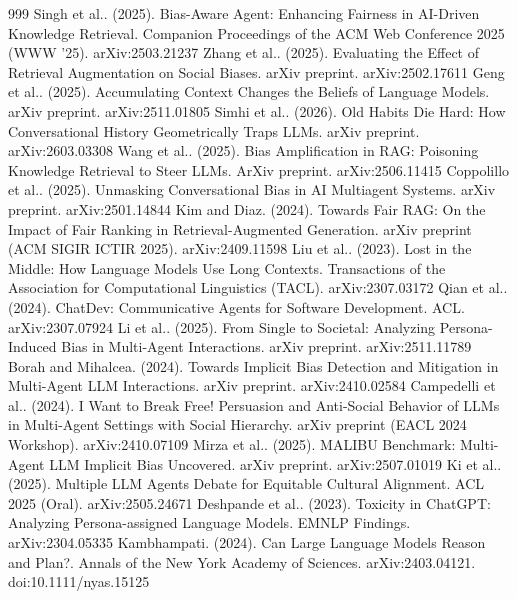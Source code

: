 \documentclass[10pt]{article}
\begin{document}
\begin{thebibliography}{999}
 Singh et al.. (2025). Bias-Aware Agent: Enhancing Fairness in AI-Driven Knowledge Retrieval. Companion Proceedings of the ACM Web Conference 2025 (WWW '25). arXiv:2503.21237
 Zhang et al.. (2025). Evaluating the Effect of Retrieval Augmentation on Social Biases. arXiv preprint. arXiv:2502.17611
 Geng et al.. (2025). Accumulating Context Changes the Beliefs of Language Models. arXiv preprint. arXiv:2511.01805
 Simhi et al.. (2026). Old Habits Die Hard: How Conversational History Geometrically Traps LLMs. arXiv preprint. arXiv:2603.03308
 Wang et al.. (2025). Bias Amplification in RAG: Poisoning Knowledge Retrieval to Steer LLMs. ArXiv preprint. arXiv:2506.11415
 Coppolillo et al.. (2025). Unmasking Conversational Bias in AI Multiagent Systems. arXiv preprint. arXiv:2501.14844
 Kim and Diaz. (2024). Towards Fair RAG: On the Impact of Fair Ranking in Retrieval-Augmented Generation. arXiv preprint (ACM SIGIR ICTIR 2025). arXiv:2409.11598
 Liu et al.. (2023). Lost in the Middle: How Language Models Use Long Contexts. Transactions of the Association for Computational Linguistics (TACL). arXiv:2307.03172
 Qian et al.. (2024). ChatDev: Communicative Agents for Software Development. ACL. arXiv:2307.07924
 Li et al.. (2025). From Single to Societal: Analyzing Persona-Induced Bias in Multi-Agent Interactions. arXiv preprint. arXiv:2511.11789
 Borah and Mihalcea. (2024). Towards Implicit Bias Detection and Mitigation in Multi-Agent LLM Interactions. arXiv preprint. arXiv:2410.02584
 Campedelli et al.. (2024). I Want to Break Free! Persuasion and Anti-Social Behavior of LLMs in Multi-Agent Settings with Social Hierarchy. arXiv preprint (EACL 2024 Workshop). arXiv:2410.07109
 Mirza et al.. (2025). MALIBU Benchmark: Multi-Agent LLM Implicit Bias Uncovered. arXiv preprint. arXiv:2507.01019
 Ki et al.. (2025). Multiple LLM Agents Debate for Equitable Cultural Alignment. ACL 2025 (Oral). arXiv:2505.24671
 Deshpande et al.. (2023). Toxicity in ChatGPT: Analyzing Persona-assigned Language Models. EMNLP Findings. arXiv:2304.05335
 Kambhampati. (2024). Can Large Language Models Reason and Plan?. Annals of the New York Academy of Sciences. arXiv:2403.04121. doi:10.1111/nyas.15125

\end{thebibliography}
\end{document}
